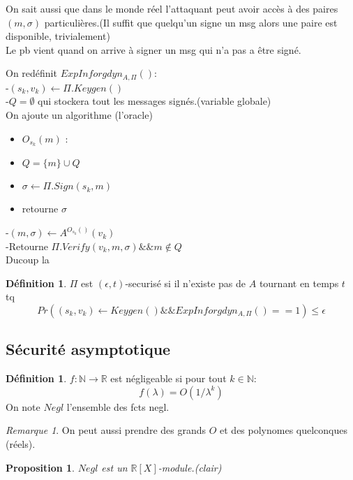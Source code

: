 \documentclass[12pt]{article}
\theoremstyle{plain}
\newtheorem{prop}[subsubsection]{Proposition}
\theoremstyle{definition}
\newtheorem{defn}[subsubsection]{D\'efinition}
\theoremstyle{remark}
\newtheorem{rem}{Remarque}
\newcommand{\N}{\mathbb{N}}
\newcommand{\R}{\mathbb{R}}
\begin{document}
On sait aussi que dans le monde réel l'attaquant peut avoir accès à des paires $(m,\sigma)$ particulières.(Il suffit que quelqu'un signe un msg alors une paire est disponible, trivialement)\\

\indent Le pb vient quand on arrive à signer un msg qui n'a pas a être signé. \\
\newline

On redéfinit $ExpInforgdyn_{A,\Pi}()$: \\
\indent \indent -$(s_k,v_k)\leftarrow \Pi.Keygen()$\\
\indent \indent -$Q=\emptyset$ qui stockera tout les messages signés.(variable globale)\\
\noindent On ajoute un algorithme (l'oracle)
\begin{itemize}
    \item $O_{s_k}(m)$ :
    \item $Q = \{m\}\cup Q$ 
    \item $\sigma\leftarrow \Pi.Sign(s_k, m)$
    \item retourne $\sigma$
\end{itemize}

\indent \indent-$(m, \sigma)\leftarrow A^{O_{s_k}()}(v_k)$\\
\indent \indent-Retourne $\Pi.Verify(v_k, m, \sigma) \&\& m\notin Q$\\

Ducoup la 
\begin{defn}
    $\Pi$ est $(\epsilon, t)$-securisé si il n'existe pas de $A$ tournant en temps $t$ tq 
    $$Pr((s_k,v_k)\leftarrow Keygen() \&\& ExpInforgdyn_{A,\Pi}()==1)\leq \epsilon$$
\end{defn}


\subsection{Sécurité asymptotique}
\begin{defn}
    $f:\N\rightarrow\R$ est négligeable si pour tout $k\in\N$:$$f(\lambda)=O(1/\lambda^k)$$On note $Negl$ l'ensemble des fcts negl.
\end{defn}

\begin{rem}
    On peut aussi prendre des grands $O$ et des polynomes quelconques (réels).
\end{rem}

\begin{prop}
    $Negl$ est un $\R[X]$-module.(clair)
\end{prop}
\end{document}
